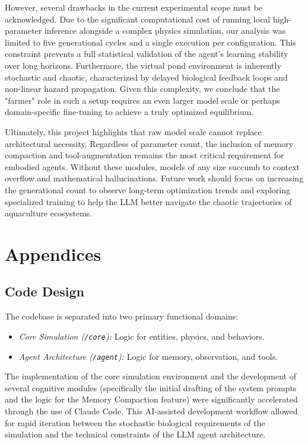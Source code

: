 \documentclass[conference]{IEEEtran}
\begin{document}
However, several drawbacks in the current experimental scope must be acknowledged. Due to the significant computational cost of running local high-parameter inference alongside a complex physics simulation, our analysis was limited to five generational cycles and a single execution per configuration. This constraint prevents a full statistical validation of the agent's learning stability over long horizons. Furthermore, the virtual pond environment is inherently stochastic and chaotic, characterized by delayed biological feedback loops and non-linear hazard propagation. Given this complexity, we conclude that the "farmer" role in such a setup requires an even larger model scale or perhaps domain-specific fine-tuning to achieve a truly optimized equilibrium.

Ultimately, this project highlights that raw model scale cannot replace architectural necessity. Regardless of parameter count, the inclusion of memory compaction and tool-augmentation remains the most critical requirement for embodied agents. Without these modules, models of any size succumb to context overflow and mathematical hallucinations. Future work should focus on increasing the generational count to observe long-term optimization trends and exploring specialized training to help the LLM better navigate the chaotic trajectories of aquaculture ecosystems.

\section{Appendices}

\subsection{Code Design}
The codebase is separated into two primary functional domains:
\begin{itemize}
    \item \textit{Core Simulation (\texttt{/core}):} Logic for entities, physics, and behaviors.
    \item \textit{Agent Architecture (\texttt{/agent}):} Logic for memory, observation, and tools.
\end{itemize}
The implementation of the core simulation environment and the development of several cognitive modules (specifically the initial drafting of the system prompts and the logic for the Memory Compaction feature) were significantly accelerated through the use of Claude Code. This AI-assisted development workflow allowed for rapid iteration between the stochastic biological requirements of the simulation and the technical constraints of the LLM agent architecture.
\end{document}
